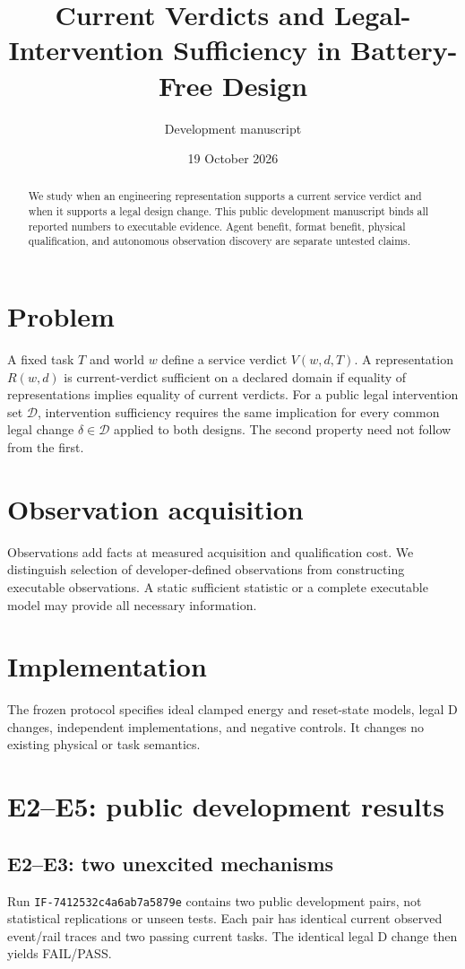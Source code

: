 \documentclass[10pt]{article}
\title{Current Verdicts and Legal-Intervention Sufficiency in Battery-Free Design}
\author{Development manuscript}
\date{19 October 2026}
\begin{document}
\maketitle
\begin{abstract}
We study when an engineering representation supports a current service verdict and when it supports a legal design change. This public development manuscript binds all reported numbers to executable evidence. Agent benefit, format benefit, physical qualification, and autonomous observation discovery are separate untested claims.
\end{abstract}
\section{Problem}
A fixed task $T$ and world $w$ define a service verdict $V(w,d,T)$. A representation $R(w,d)$ is current-verdict sufficient on a declared domain if equality of representations implies equality of current verdicts. For a public legal intervention set $\mathcal D$, intervention sufficiency requires the same implication for every common legal change $\delta\in\mathcal D$ applied to both designs. The second property need not follow from the first.
\section{Observation acquisition}
Observations add facts at measured acquisition and qualification cost. We distinguish selection of developer-defined observations from constructing executable observations. A static sufficient statistic or a complete executable model may provide all necessary information.
\section{Implementation}
The frozen protocol specifies ideal clamped energy and reset-state models, legal D changes, independent implementations, and negative controls. It changes no existing physical or task semantics.
\section{E2--E5: public development results}
\subsection{E2--E3: two unexcited mechanisms}
Run \texttt{IF-7412532c4a6ab7a5879e} contains two public development pairs, not statistical replications or unseen tests. Each pair has identical current observed event/rail traces and two passing current tasks. The identical legal D change then yields FAIL/PASS.
\end{document}
